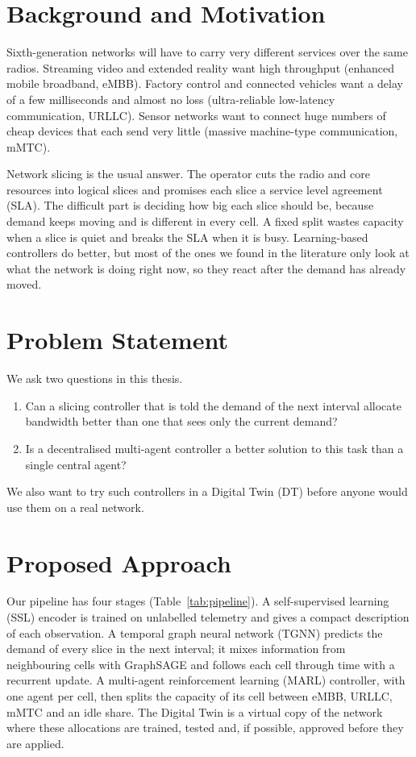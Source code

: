 \label{chap.1}
\section{Background and Motivation}
Sixth-generation networks will have to carry very different services over the same radios. Streaming video and extended reality want high throughput (enhanced mobile broadband, eMBB). Factory control and connected vehicles want a delay of a few milliseconds and almost no loss (ultra-reliable low-latency communication, URLLC). Sensor networks want to connect huge numbers of cheap devices that each send very little (massive machine-type communication, mMTC).

Network slicing is the usual answer. The operator cuts the radio and core resources into logical slices and promises each slice a service level agreement (SLA). The difficult part is deciding how big each slice should be, because demand keeps moving and is different in every cell. A fixed split wastes capacity when a slice is quiet and breaks the SLA when it is busy. Learning-based controllers do better, but most of the ones we found in the literature only look at what the network is doing right now, so they react after the demand has already moved.

\section{Problem Statement}
We ask two questions in this thesis.
\begin{enumerate}
	\item Can a slicing controller that is told the demand of the next interval allocate bandwidth better than one that sees only the current demand?
	\item Is a decentralised multi-agent controller a better solution to this task than a single central agent?
\end{enumerate}
We also want to try such controllers in a Digital Twin (DT) before anyone would use them on a real network.

\section{Proposed Approach}
Our pipeline has four stages (Table~\ref{tab:pipeline}). A self-supervised learning (SSL) encoder is trained on unlabelled telemetry and gives a compact description of each observation. A temporal graph neural network (TGNN) predicts the demand of every slice in the next interval; it mixes information from neighbouring cells with GraphSAGE \cite{hamilton2017} and follows each cell through time with a recurrent update. A multi-agent reinforcement learning (MARL) controller, with one agent per cell, then splits the capacity of its cell between eMBB, URLLC, mMTC and an idle share. The Digital Twin is a virtual copy of the network where these allocations are trained, tested and, if possible, approved before they are applied.

